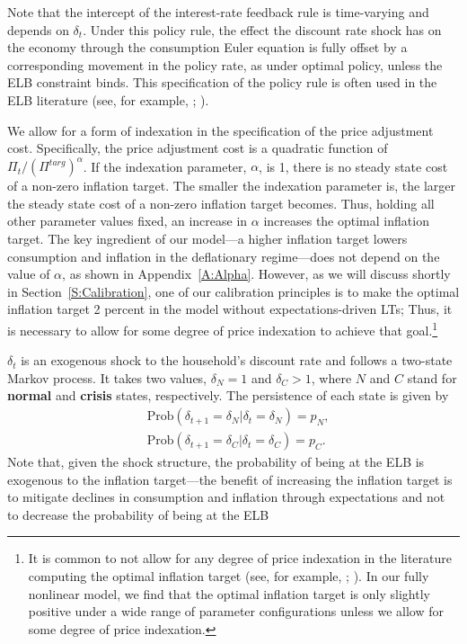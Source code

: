 \documentclass[11pt]{article}
\begin{document}
	Note that the intercept of the interest-rate feedback rule is time-varying and depends on $\delta_{t}$. Under this policy rule, the effect the discount rate shock has on the economy through the consumption Euler equation is fully offset by a corresponding movement in the policy rate, as under optimal policy, unless the ELB constraint binds. This specification of the policy rule is often used in the ELB literature (see, for example, \citet{BonevaBraunWaki2016}; \citet{Eggertsson2011}).

	We allow for a form of indexation in the specification of the price adjustment cost. Specifically, the price adjustment cost is a quadratic function of $\Pi_{t}/(\Pi^{targ})^{\alpha}$. If the indexation parameter, $\alpha$, is 1, there is no steady state cost of a non-zero inflation target. The smaller the indexation parameter is, the larger the steady state cost of a non-zero inflation target becomes. Thus, holding all other parameter values fixed, an increase in $\alpha$ increases the optimal inflation target. The key ingredient of our model---a higher inflation target lowers consumption and inflation in the deflationary regime---does not depend on the value of $\alpha$, as shown in Appendix~\ref{A:Alpha}. However, as we will discuss shortly in Section~\ref{S:Calibration}, one of our calibration principles is to make the optimal inflation target 2 percent in the model without expectations-driven LTs; Thus, it is necessary to allow for some degree of price indexation to achieve that goal.\footnote{It is common to not allow for any degree of price indexation in the literature computing the optimal inflation target (see, for example, \citet{CoibionGorodnichenkoWieland2012};  \citet{AndradeGaliLeBihanMatheron2018}). In our fully nonlinear model, we find that the optimal inflation target is only slightly positive under a wide range of parameter configurations unless we allow for some degree of price indexation.}

	$\delta_{t}$ is an exogenous shock to the household's discount rate and follows a two-state Markov process. It takes two values, $\delta_{N}=1$ and $\delta_{C}>1$, where $N$ and $C$ stand for \textbf{normal} and \textbf{crisis} states, respectively. The persistence of each state is given by
	\begin{align}
		& \text{Prob}(\delta_{t+1}=\delta_{N}|\delta_{t}=\delta_{N})= p_{N},\\
		& \text{Prob}(\delta_{t+1}=\delta_{C}|\delta_{t}=\delta_{C})= p_{C}.
	\end{align}
	Note that, given the shock structure, the probability of being at the ELB is exogenous to the inflation target---the benefit of increasing the inflation target is to mitigate declines in consumption and inflation through expectations and not to decrease the probability
	of being at the ELB
\end{document}
